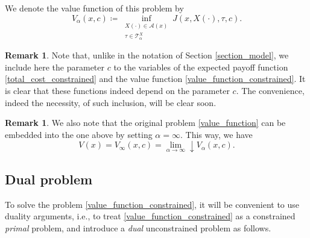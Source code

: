 \documentclass[11pt,tbtags,reqno]{article}
\theoremstyle{definition}
\newtheorem{remark}[Th]{Remark}
\numberwithin{equation}{section}
\theoremstyle{definition}
\begin{document}
We denote the value function of this problem by
\begin{equation}\label{value_function_constrained}
    V_\alpha(x, c) \coloneqq \inf\limits_{\substack{X(\cdot) \in \mathcal{A}(x) \\ \tau \in \mathcal{T}^X_\alpha}} J(x, X(\cdot), \tau, c).
\end{equation}

\begin{remark}
    Note that, unlike in the notation of Section \ref{section_model}, we include here the parameter $c$ to the variables of the expected payoff function \eqref{total_cost_constrained} and the value function \eqref{value_function_constrained}. It is clear that these functions indeed depend on the parameter $c$. The convenience, indeed the necessity, of such inclusion, will be clear soon.
\end{remark}

\begin{remark}
    We also note that the original problem \eqref{value_function} can be embedded into the one above by setting $\alpha = \infty$. This way, we have
    \begin{equation}
        V(x) = V_\infty(x, c) = \lim_{\alpha \to \infty} \downarrow V_\alpha(x, c).
    \end{equation}
\end{remark}

\subsection{Dual problem}

To solve the problem \eqref{value_function_constrained}, it will be convenient to use duality arguments, i.e., to treat \eqref{value_function_constrained} as a constrained \textit{primal} problem, and introduce a \textit{dual} unconstrained problem as follows.
\end{document}
